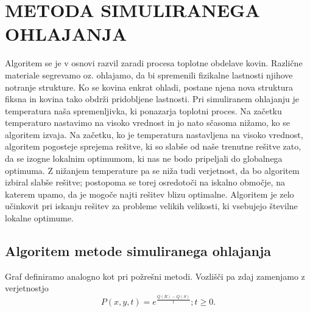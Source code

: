 \documentclass[12pt,a4paper]{amsart}
\theoremstyle{definition} %
\theoremstyle{plain} %
\begin{document}
\section{\textbf{METODA SIMULIRANEGA OHLAJANJA}}
Algoritem se je v osnovi razvil zaradi procesa toplotne obdelave kovin. Različne materiale segrevamo oz. ohlajamo, da bi spremenili fizikalne lastnosti njihove notranje strukture. Ko se kovina enkrat ohladi, postane njena nova struktura fiksna in kovina tako obdrži pridobljene lastnosti. Pri simuliranem ohlajanju je temperatura naša spremenljivka, ki ponazarja toplotni proces. Na začetku temperaturo nastavimo na visoko vrednost in jo nato sčasoma nižamo, ko se algoritem izvaja. Na začetku, ko je temperatura nastavljena na visoko vrednost, algoritem pogosteje sprejema rešitve, ki so slabše od naše trenutne rešitve zato, da se izogne lokalnim optimumom, ki nas ne bodo pripeljali do globalnega optimuma. Z nižanjem temperature pa se niža tudi verjetnost, da bo algoritem izbiral slabše rešitve; postopoma se torej osredotoči na iskalno območje, na katerem upamo, da je mogoče najti rešitev blizu optimalne. Algoritem je zelo učinkovit pri iskanju rešitev za probleme velikih velikosti, ki vsebujejo številne lokalne optimume. \\

\subsection{Algoritem metode simuliranega ohlajanja}
Graf definiramo analogno kot pri požrešni metodi. Vozlišči pa zdaj zamenjamo z verjetnostjo \\
$$P(x,y,t) = e^{\frac{Q(R)-Q(S)}{t}}; t\ge 0.$$ \\
\end{document}
